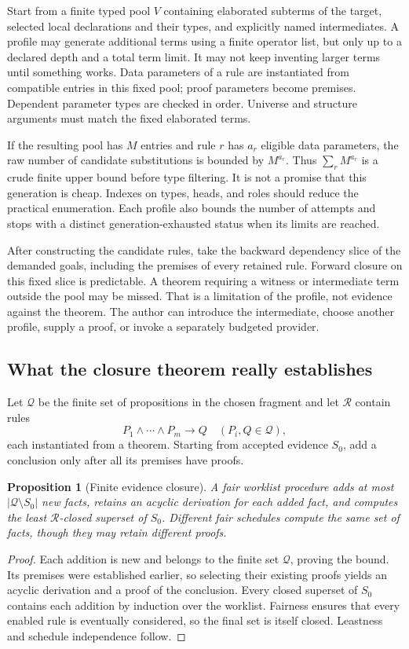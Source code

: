 \documentclass[11pt,letterpaper]{article}
\newtheorem{proposition}[theorem]{Proposition}
\theoremstyle{definition}\newtheorem{definition}[theorem]{Definition}
\theoremstyle{remark}\newtheorem{remark}[theorem]{Remark}
\begin{document}
Start from a finite typed pool $V$ containing elaborated subterms of the target,
selected local declarations and their types, and explicitly named
intermediates. A profile may generate additional terms using a finite operator
list, but only up to a declared depth and a total term limit. It may not keep
inventing larger terms until something works. Data parameters of a rule are
instantiated from compatible entries in this fixed pool; proof parameters
become premises. Dependent parameter types are checked in order. Universe and
structure arguments must match the fixed elaborated terms.

If the resulting pool has $M$ entries and rule $r$ has $a_r$ eligible data
parameters, the raw number of candidate substitutions is bounded by
$M^{a_r}$. Thus $\sum_r M^{a_r}$ is a crude finite upper bound before type
filtering. It is not a promise that this generation is cheap. Indexes on types,
heads, and roles should reduce the practical enumeration. Each profile also
bounds the number of attempts and stops with a distinct generation-exhausted
status when its limits are reached.

After constructing the candidate rules, take the backward dependency slice of
the demanded goals, including the premises of every retained rule. Forward
closure on this fixed slice is predictable. A theorem requiring a witness or
intermediate term outside the pool may be missed. That is a limitation of the
profile, not evidence against the theorem. The author can introduce the
intermediate, choose another profile, supply a proof, or invoke a separately
budgeted provider.

\subsection{What the closure theorem really establishes}
Let $\mathcal Q$ be the finite set of propositions in the chosen fragment and
let $\mathcal R$ contain rules
\[
 P_1\wedge\cdots\wedge P_m\longrightarrow Q
 \quad(P_i,Q\in\mathcal Q),
\]
each instantiated from a theorem. Starting from accepted evidence $S_0$, add a
conclusion only after all its premises have proofs.

\begin{proposition}[Finite evidence closure]
A fair worklist procedure adds at most $|\mathcal Q\setminus S_0|$ new facts,
retains an acyclic derivation for each added fact, and computes the least
$\mathcal R$-closed superset of $S_0$. Different fair schedules compute the
same set of facts, though they may retain different proofs.
\end{proposition}
\begin{proof}
Each addition is new and belongs to the finite set $\mathcal Q$, proving the
bound. Its premises were established earlier, so selecting their existing
proofs yields an acyclic derivation and a proof of the conclusion. Every closed
superset of $S_0$ contains each addition by induction over the worklist. Fairness
ensures that every enabled rule is eventually considered, so the final set is
itself closed. Leastness and schedule independence follow.
\end{proof}
\end{document}
